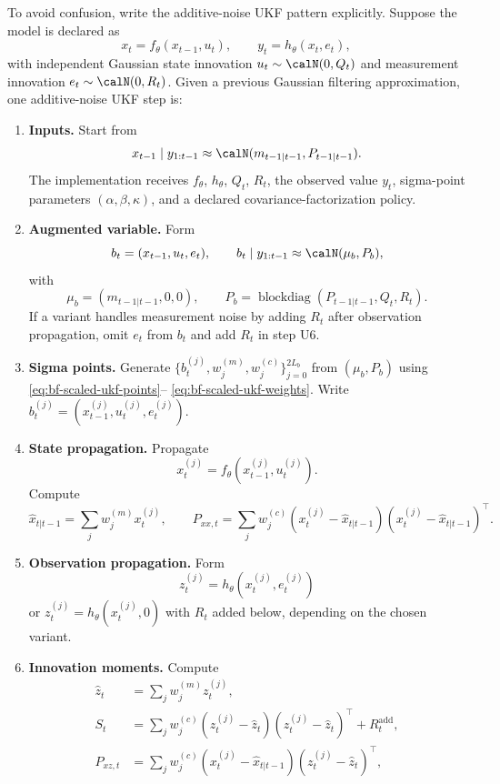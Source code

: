 To avoid confusion, write the additive-noise UKF pattern explicitly.  Suppose
the model is declared as
\[
  x_t = f_\theta(x_{t-1},u_t),
  \qquad
  y_t = h_\theta(x_t,e_t),
\]
with independent Gaussian state innovation $u_t\sim\calN(0,Q_t)$ and
measurement innovation $e_t\sim\calN(0,R_t)$.  Given a previous Gaussian
filtering approximation, one additive-noise UKF step is:
\begin{enumerate}[label=\textbf{U\arabic*.}]
  \item \textbf{Inputs.}  Start from
    \[
      x_{t-1}\mid y_{1:t-1} \approx \calN(m_{t-1|t-1},P_{t-1|t-1}).
    \]
    The implementation receives $f_\theta$, $h_\theta$, $Q_t$, $R_t$, the
    observed value $y_t$, sigma-point parameters
    $(\alpha,\beta,\kappa)$, and a declared covariance-factorization policy.
  \item \textbf{Augmented variable.}  Form
    \[
      b_t=(x_{t-1},u_t,e_t),
      \qquad
      b_t\mid y_{1:t-1}\approx \calN(\mu_b,P_b),
    \]
    with
    \[
      \mu_b=(m_{t-1|t-1},0,0),\qquad
      P_b=\operatorname{blockdiag}(P_{t-1|t-1},Q_t,R_t).
    \]
    If a variant handles measurement noise by adding $R_t$ after observation
    propagation, omit $e_t$ from $b_t$ and add $R_t$ in step U6.
  \item \textbf{Sigma points.}  Generate
    $\{b_t^{(j)},w_j^{(m)},w_j^{(c)}\}_{j=0}^{2L_b}$ from
    $(\mu_b,P_b)$ using \eqref{eq:bf-scaled-ukf-points}--%
    \eqref{eq:bf-scaled-ukf-weights}.  Write
    $b_t^{(j)}=(x_{t-1}^{(j)},u_t^{(j)},e_t^{(j)})$.
  \item \textbf{State propagation.}  Propagate
    \[
      x_t^{(j)}=f_\theta(x_{t-1}^{(j)},u_t^{(j)}).
    \]
    Compute
    \[
      \hat x_{t|t-1}=\sum_j w_j^{(m)}x_t^{(j)},\qquad
      P_{xx,t}=\sum_j w_j^{(c)}
      (x_t^{(j)}-\hat x_{t|t-1})(x_t^{(j)}-\hat x_{t|t-1})^\top .
    \]
  \item \textbf{Observation propagation.}  Form
    \[
      z_t^{(j)}=h_\theta(x_t^{(j)},e_t^{(j)})
    \]
    or $z_t^{(j)}=h_\theta(x_t^{(j)},0)$ with $R_t$ added below, depending on
    the chosen variant.
  \item \textbf{Innovation moments.}  Compute
    \begin{align}
      \hat z_t &= \sum_j w_j^{(m)}z_t^{(j)},\\
      S_t &=
        \sum_j w_j^{(c)}(z_t^{(j)}-\hat z_t)(z_t^{(j)}-\hat z_t)^\top
        + R_t^{\mathrm{add}},\\
      P_{xz,t} &=
        \sum_j w_j^{(c)}
        (x_t^{(j)}-\hat x_{t|t-1})(z_t^{(j)}-\hat z_t)^\top,

\end{align}
\end{enumerate}

